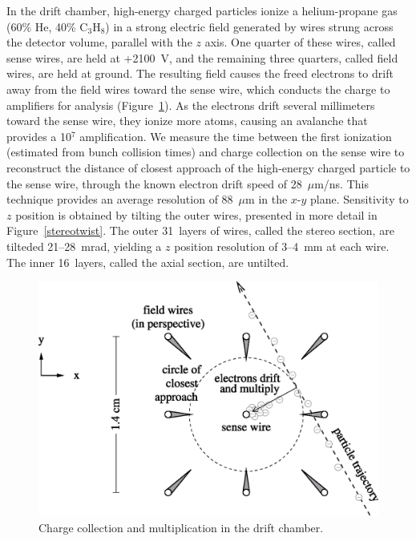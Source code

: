 \documentclass{cornell}
\begin{document}
In the drift chamber, high-energy charged particles ionize a
helium-propane gas (60\% He, 40\% C$_3$H$_8$) in a strong electric
field generated by wires strung across the detector volume, parallel
with the $z$ axis.  One quarter of these wires, called sense wires,
are held at $+$2100~V, and the remaining three quarters, called field
wires, are held at ground.  The resulting field causes the freed
electrons to drift away from the field wires toward the sense wire,
which conducts the charge to amplifiers for analysis
(Figure~\ref{driftcell}).  As the electrons drift several millimeters
toward the sense wire, they ionize more atoms, causing an avalanche
that provides a 10$^7$ amplification.  We measure the time between the
first ionization (estimated from bunch collision times) and charge
collection on the sense wire to reconstruct the distance of closest
approach of the high-energy charged particle to the sense wire,
through the known electron drift speed of 28~$\mu$m/ns.  This
technique provides an average resolution of 88~$\mu$m in the $x$-$y$
plane.  Sensitivity to $z$ position is obtained by tilting the outer
wires, presented in more detail in Figure~\ref{stereotwist}.  The
outer 31~layers of wires, called the stereo section, are tilteded
21--28~mrad, yielding a $z$ position resolution of 3--4~mm at each
wire.  The inner 16~layers, called the axial section, are untilted.

\begin{figure}[p]
  \begin{center}
    \includegraphics[width=0.75\linewidth]{driftcell}
    \mbox{\hspace{2 cm}}
  \end{center}
  \caption[Charge collection and multiplication in the drift
  chamber]{\label{driftcell} Charge collection and multiplication in
  the drift chamber.}
\end{figure}
\end{document}
